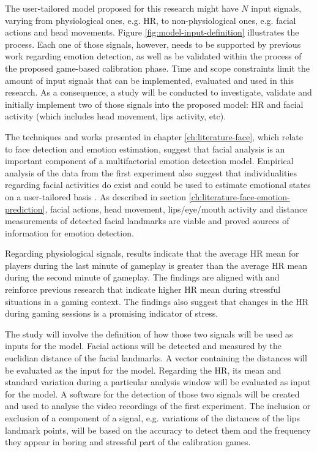 The user-tailored model proposed for this research might have $N$ input signals, varying from physiological ones, e.g. HR, to non-physiological ones, e.g. facial actions and head movements. Figure \ref{fig:model-input-definition} illustrates the process. Each one of those signals, however, needs to be supported by previous work regarding emotion detection, as well as be validated within the process of the proposed game-based calibration phase. Time and scope constraints limit the amount of input signals that can be implemented, evaluated and used in this research. As a consequence, a study will be conducted to investigate, validate and initially implement two of those signals into the proposed model: HR and facial activity (which includes head movement, lips activity, etc).

The techniques and works presented in chapter \ref{ch:literature-face}, which relate to face detection and emotion estimation, suggest that facial analysis is an important component of a multifactorial emotion detection model. Empirical analysis of the data from the first experiment also suggest that individualities regarding facial activities do exist and could be used to estimate emotional states on a user-tailored basis \parencite{bevilacqua2016variations}. As described in section \ref{ch:literature-face-emotion-prediction}, facial actions, head movement, lips/eye/mouth activity and distance measurements of detected facial landmarks are viable and proved sources of information for emotion detection.

Regarding physiological signals, results indicate that the average HR mean for players during the last minute of gameplay is greater than the average HR mean during the second minute of gameplay. The findings are aligned with and reinforce previous research that indicate higher HR mean during stressful situations in a gaming context. The findings also suggest that changes in the HR during gaming sessions is a promising indicator of stress.

The study will involve the definition of how those two signals will be used as inputs for the model. Facial actions will be detected and measured by the euclidian distance of the facial landmarks. A vector containing the distances will be evaluated as the input for the model. Regarding the HR, its mean and standard variation during a particular analysis window will be evaluated as input for the model. A software for the detection of those two signals will be created and used to analyse the video recordings of the first experiment. The inclusion or exclusion of a component of a signal, e.g. variations of the distances of the lips landmark points, will be based on the accuracy to detect them and the frequency they appear in boring and stressful part of the calibration games.

